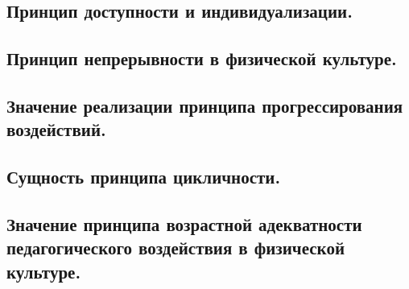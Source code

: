 \subsection{Принцип доступности и индивидуализации.}



\subsection{Принцип непрерывности в физической культуре.}



\subsection{Значение реализации принципа прогрессирования воздействий.}



\subsection{Сущность принципа цикличности.}



\subsection{Значение принципа возрастной адекватности педагогического воздействия в физической культуре.}
